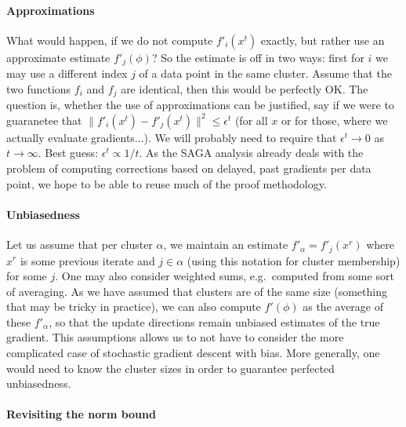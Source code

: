 \documentclass{article}
\begin{document}
\paragraph*{Approximations} 
What would happen, if we do not compute $f'_i(x^t)$ exactly, but rather use an approximate estimate $f'_j(\phi)$? So the estimate is off in two ways: first for $i$ we may use a different index $j$ of a data point in the same cluster. Assume that the two functions $f_i$ and $f_j$ are identical, then this would be perfectly OK. The question is, whether the use of approximations can be justified, say if we were to guaranetee that  $\| f'_i(x^t) - f'_j(x^t)\|^2 \leq \epsilon^t$ (for all $x$ or for those, where we actually evaluate gradients...). We will probably need to require that $\epsilon^t \to 0$ as $t \to \infty$. Best guess: $\epsilon^t \propto 1/t$. As the SAGA analysis already deals with the problem of computing corrections based on delayed, past gradients per data point, we hope to be able to reuse much of the proof methodology. 

\paragraph*{Unbiasedness} Let us assume that per cluster $\alpha$, we maintain an estimate $f'_\alpha = f'_j(x^r)$ where $x^r$ is some previous iterate and $j \in \alpha$ (using this notation for cluster membership) for some $j$. One may also consider weighted sums, e.g.~computed from some sort of averaging. As we have assumed that clusters are of the same size (something that may be tricky in practice), we can also compute $f'(\phi)$ as the average of these $f'_\alpha$, so that the update directions remain unbiased estimates of the true gradient. This assumptions allows us to not have to consider the more complicated case of stochastic gradient descent with bias. More generally, one would need to know the cluster sizes in order to guarantee perfected unbiasedness. 

\paragraph*{Revisiting the norm bound} 
\end{document}

